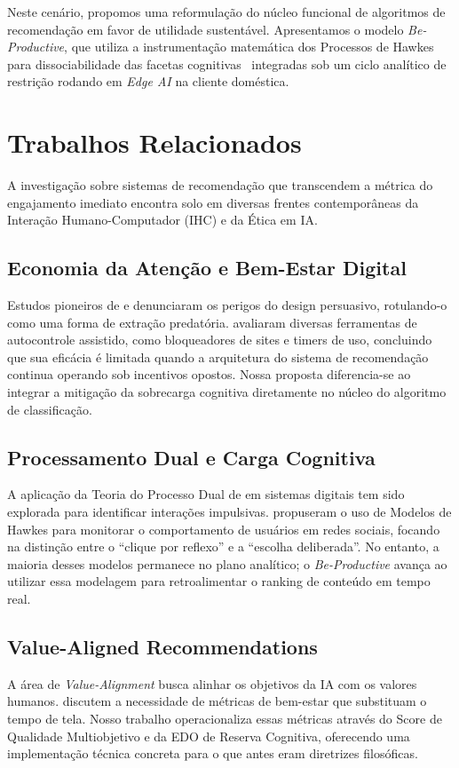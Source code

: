 \documentclass{sbc2023}
\begin{document}
Neste cenário, propomos uma reformulação do núcleo funcional de algoritmos de recomendação em favor de utilidade sustentável. Apresentamos o modelo \textit{Be-Productive}, que utiliza a instrumentação matemática dos Processos de Hawkes para dissociabilidade das facetas cognitivas~\citep{kahneman2011, paas2023} integradas sob um ciclo analítico de restrição rodando em \textit{Edge AI} na cliente doméstica.

\section{Trabalhos Relacionados} \label{sec:related_work}

A investigação sobre sistemas de recomendação que transcendem a métrica do engajamento imediato encontra solo em diversas frentes contemporâneas da Interação Humano-Computador (IHC) e da Ética em IA.

\subsection{Economia da Atenção e Bem-Estar Digital}
Estudos pioneiros de \citet{zuboff2019} e \citet{harris2019} denunciaram os perigos do design persuasivo, rotulando-o como uma forma de extração predatória. \citet{lyngs2019} avaliaram diversas ferramentas de autocontrole assistido, como bloqueadores de sites e timers de uso, concluindo que sua eficácia é limitada quando a arquitetura do sistema de recomendação continua operando sob incentivos opostos. Nossa proposta diferencia-se ao integrar a mitigação da sobrecarga cognitiva diretamente no núcleo do algoritmo de classificação.

\subsection{Processamento Dual e Carga Cognitiva}
A aplicação da Teoria do Processo Dual de \citet{kahneman2011} em sistemas digitais tem sido explorada para identificar interações impulsivas. \citet{agarwal2024} propuseram o uso de Modelos de Hawkes para monitorar o comportamento de usuários em redes sociais, focando na distinção entre o ``clique por reflexo'' e a ``escolha deliberada''. No entanto, a maioria desses modelos permanece no plano analítico; o \textit{Be-Productive} avança ao utilizar essa modelagem para retroalimentar o ranking de conteúdo em tempo real.

\subsection{Value-Aligned Recommendations}
A área de \textit{Value-Alignment} busca alinhar os objetivos da IA com os valores humanos. \citet{stray2021} discutem a necessidade de métricas de bem-estar que substituam o tempo de tela. Nosso trabalho operacionaliza essas métricas através do Score de Qualidade Multiobjetivo e da EDO de Reserva Cognitiva, oferecendo uma implementação técnica concreta para o que antes eram diretrizes filosóficas.
\end{document}

